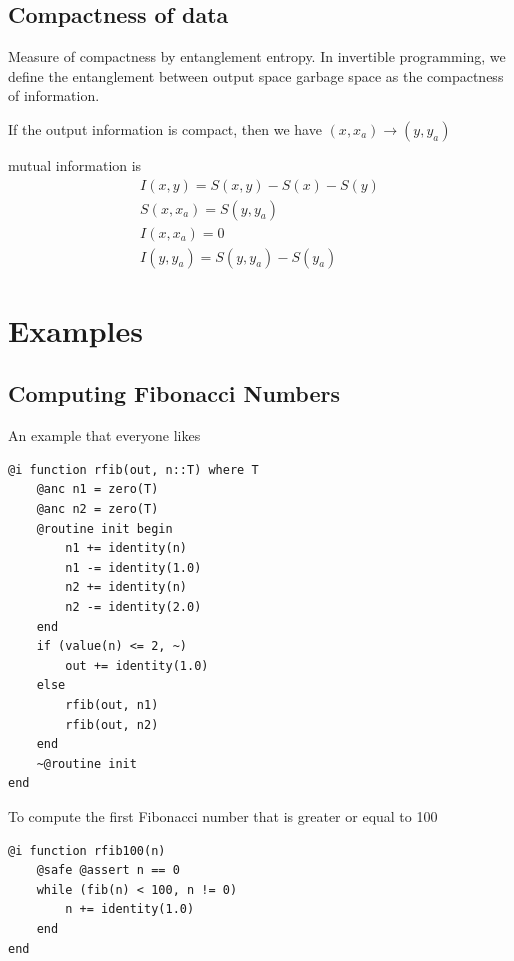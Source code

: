 \documentclass[aps,twocolumn,longbibliography,english,superscriptaddress,prr]{revtex4-1}
\newcommand{\<}{\langle}
\renewcommand{\>}{\rangle}
\theoremstyle{definition}\newtheorem{definition}{\textit{Definition}}
\begin{document}
\subsection{Compactness of data}
Measure of compactness by entanglement entropy.
In invertible programming, we define the entanglement between output space garbage space as the compactness of information.

If the output information is compact, then we have
$(x, x_a)\rightarrow (y, y_a)$

mutual information is
\begin{align}
    I(x, y) = S(x, y) - S(x) - S(y)\\
    S(x, x_a) = S(y, y_a)\\
    I(x, x_a) = 0\\
    I(y, y_a) = S(y, y_a) - S(y_a)
\end{align}


\section{Examples}\label{sec:example}

\subsection{Computing Fibonacci Numbers}\label{sec:fib}
An example that everyone likes

\begin{minipage}{.44\textwidth}
\begin{lstlisting}
@i function rfib(out, n::T) where T
    @anc n1 = zero(T)
    @anc n2 = zero(T)
    @routine init begin
        n1 += identity(n)
        n1 -= identity(1.0)
        n2 += identity(n)
        n2 -= identity(2.0)
    end
    if (value(n) <= 2, ~)
        out += identity(1.0)
    else
        rfib(out, n1)
        rfib(out, n2)
    end
    ~@routine init
end
\end{lstlisting}
\end{minipage}

To compute the first Fibonacci number that is greater or equal to 100

\begin{minipage}{.44\textwidth}
\begin{lstlisting}
@i function rfib100(n)
    @safe @assert n == 0
    while (fib(n) < 100, n != 0)
        n += identity(1.0)
    end
end
\end{lstlisting}
\end{minipage}
\end{document}
